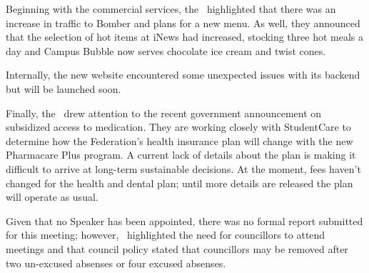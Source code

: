 \documentclass[12pt, letterpaper]{article}
\begin{document}
\begin{information}

    Beginning with the commercial services, the \vpof\ highlighted that there
    was an increase in traffic to Bomber and plans for a new menu. 
    As well, they announced that the selection of hot items at iNews had 
    increased, stocking three hot meals a day and Campus Bubble
    now serves chocolate ice cream and twist cones. 

    Internally, the new website encountered some unexpected issues
    with its backend but will be launched soon. 

    Finally, the \vpof\ drew attention to the recent government announcement
    on subsidized access to medication. 
    They are working closely with StudentCare to determine how the 
    Federation's health insurance plan will change with the new Pharmacare
    Plus program. A current lack of details about the
    plan is making it difficult to arrive at long-term sustainable decisions. 
    At the moment, fees haven't changed for the health and dental plan; until 
    more details are released the plan will operate as usual. 

\end{information}

\begin{information}

    Given that no Speaker has been appointed, there was no formal report 
    submitted for this meeting; however, \printSpeaker\ highlighted the
    need for councillors to attend meetings and that council policy 
    stated that councillors may be removed after two un-excused absenses or
    four excused absenses. 

\end{information}
\end{document}
